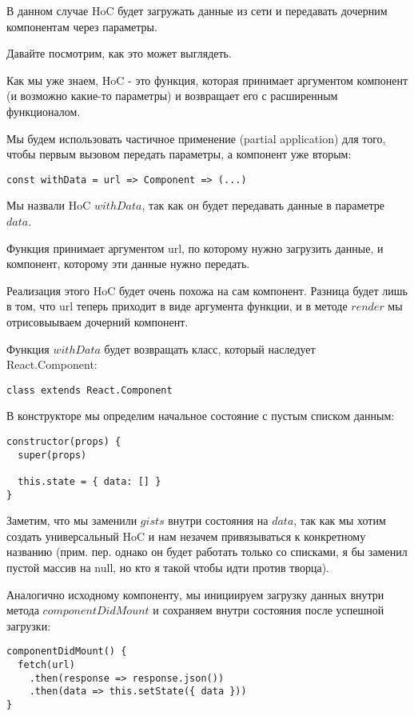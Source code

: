 В данном случае HoC будет загружать данные из сети и передавать дочерним компонентам через параметры.

Давайте посмотрим, как это может выглядеть.

Как мы уже знаем, HoC - это функция, которая принимает аргументом компонент (и возможно какие-то параметры) и возвращает его с расширенным функционалом.

Мы будем использовать частичное применение (partial application) для того, чтобы первым вызовом передать параметры, а компонент уже вторым:

\begin{lstlisting}
const withData = url => Component => (...)
\end{lstlisting}

Мы назвали HoC $withData$, так как он будет передавать данные в параметре $data$. 

Функция принимает аргументом url, по которому нужно загрузить данные, и компонент, которому эти данные нужно передать.

Реализация этого HoC будет очень похожа на сам компонент. Разница будет лишь в том, что url теперь приходит в виде аргумента функции, и в методе $render$ мы отрисовыываем дочерний компонент.

Функция $withData$ будет возвращать класс, который наследует React.Component:

\begin{lstlisting}
class extends React.Component
\end{lstlisting}

В конструкторе мы определим начальное состояние с пустым списком данным:

\begin{lstlisting}
constructor(props) {
  super(props)
  
  this.state = { data: [] }
}
\end{lstlisting}

Заметим, что мы заменили $gists$ внутри состояния на $data$, так как мы хотим создать универсальный HoC и нам незачем привязываться к конкретному названию (прим. пер. однако он будет работать только со списками, я бы заменил пустой массив на null, но кто я такой чтобы идти против творца).

Аналогично исходному компоненту, мы инициируем загрузку данных внутри метода $componentDidMount$ и сохраняем внутри состояния после успешной загрузки:

\begin{lstlisting}
componentDidMount() {
  fetch(url)
    .then(response => response.json())
    .then(data => this.setState({ data }))
}
\end{lstlisting}

